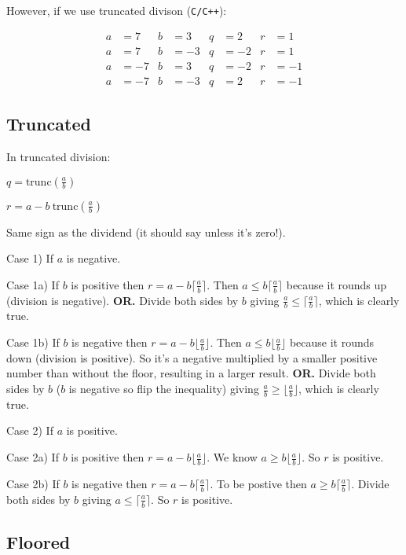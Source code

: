 However, if we use truncated divison (\texttt{C/C++}):

\begin{align*}
a &= 7  & b &= 3  & q &= 2  & r &= 1\\
a &= 7  & b &= -3 & q &= -2 & r &= 1\\
a &= -7 & b &= 3  & q &= -2 & r &= -1\\
a &= -7 & b &= -3 & q &= 2  & r &= -1
\end{align*}

\subsection{Truncated}

In truncated division:

$q = \textrm{trunc}(\frac{a}{b})$

$r = a - b\ \textrm{trunc}(\frac{a}{b})$

Same sign as the dividend (it should say unless it's zero!).

Case 1)
If $a$ is negative.

Case 1a)
If $b$ is positive then $r = a - b \lceil \frac{a}{b} \rceil$.
Then $a \leq b \lceil \frac{a}{b} \rceil$ because it rounds up (division is
negative).
\textbf{OR.}
Divide both sides by $b$ giving $\frac{a}{b} \leq \lceil \frac{a}{b} \rceil$,
which is clearly true.

Case 1b)
If $b$ is negative then $r = a - b \lfloor \frac{a}{b} \rfloor$.
Then $a \leq b \lfloor \frac{a}{b} \rfloor$ because it rounds down (division is
positive).
So it's a negative multiplied by a smaller positive number than without the
floor, resulting in a larger result.
\textbf{OR.}
Divide both sides by $b$ ($b$ is negative so flip the inequality) giving
$\frac{a}{b} \geq \lfloor \frac{a}{b} \rfloor$, which is clearly true.

Case 2)
If $a$ is positive.

Case 2a)
If $b$ is positive then $r = a - b \lfloor \frac{a}{b} \rfloor$.
We know $a \geq b \lfloor \frac{a}{b} \rfloor$.
So $r$ is positive.

Case 2b)
If $b$ is negative then $r = a - b \lceil \frac{a}{b} \rceil$.
To be postive then $a \geq b \lceil \frac{a}{b} \rceil$.
Divide both sides by $b$ giving $a \leq \lceil \frac{a}{b} \rceil$.
So $r$ is positive.

\subsection{Floored}

